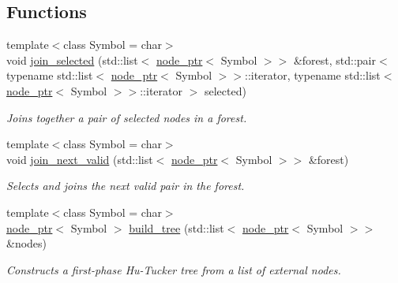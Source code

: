 \subsection*{Functions}
\begin{DoxyCompactItemize}
\item 
{\footnotesize template$<$class Symbol  = char$>$ }\\void \mbox{\hyperlink{namespaceirk_1_1coding_1_1hutucker_afc598a2671de17423c5d2c0427aab320}{join\+\_\+selected}} (std\+::list$<$ \mbox{\hyperlink{namespaceirk_1_1coding_1_1hutucker_aa5d22cfdf05ffec38f2531e0307248fe}{node\+\_\+ptr}}$<$ Symbol $>$$>$ \&forest, std\+::pair$<$ typename std\+::list$<$ \mbox{\hyperlink{namespaceirk_1_1coding_1_1hutucker_aa5d22cfdf05ffec38f2531e0307248fe}{node\+\_\+ptr}}$<$ Symbol $>$$>$\+::iterator, typename std\+::list$<$ \mbox{\hyperlink{namespaceirk_1_1coding_1_1hutucker_aa5d22cfdf05ffec38f2531e0307248fe}{node\+\_\+ptr}}$<$ Symbol $>$$>$\+::iterator $>$ selected)
\begin{DoxyCompactList}\small\item\em Joins together a pair of selected nodes in a forest. \end{DoxyCompactList}\item 
{\footnotesize template$<$class Symbol  = char$>$ }\\void \mbox{\hyperlink{namespaceirk_1_1coding_1_1hutucker_ad43136697500a2cc05315ab694767d84}{join\+\_\+next\+\_\+valid}} (std\+::list$<$ \mbox{\hyperlink{namespaceirk_1_1coding_1_1hutucker_aa5d22cfdf05ffec38f2531e0307248fe}{node\+\_\+ptr}}$<$ Symbol $>$$>$ \&forest)
\begin{DoxyCompactList}\small\item\em Selects and joins the next valid pair in the forest. \end{DoxyCompactList}\item 
{\footnotesize template$<$class Symbol  = char$>$ }\\\mbox{\hyperlink{namespaceirk_1_1coding_1_1hutucker_aa5d22cfdf05ffec38f2531e0307248fe}{node\+\_\+ptr}}$<$ Symbol $>$ \mbox{\hyperlink{namespaceirk_1_1coding_1_1hutucker_ae962db3e3b0d823d81dd74c57e129887}{build\+\_\+tree}} (std\+::list$<$ \mbox{\hyperlink{namespaceirk_1_1coding_1_1hutucker_aa5d22cfdf05ffec38f2531e0307248fe}{node\+\_\+ptr}}$<$ Symbol $>$$>$ \&nodes)
\begin{DoxyCompactList}\small\item\em Constructs a first-\/phase Hu-\/\+Tucker tree from a list of external nodes. \end{DoxyCompactList}\item 
$$
\end{DoxyCompactItemize}
